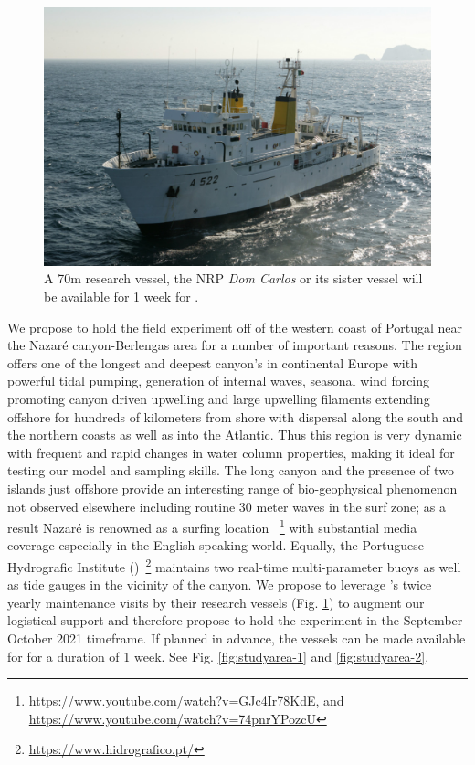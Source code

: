 \begin{figure}
  \vspace{-0.5cm}
  \centering
  \includegraphics[scale=2]{fig/dom-carlos.jpg}
  \caption{A 70m research vessel, the NRP \emph{Dom Carlos} or its
    sister vessel will be available for 1 week for \proje.}
  \vspace{-0.3cm}
 \label{fig:vessel}
\end{figure}


We propose to hold the field experiment off of the western coast of
Portugal near the Nazar\'e canyon-Berlengas area for a number of
important reasons. The region offers one of the longest and deepest
canyon's in continental Europe with powerful tidal pumping, generation
of internal waves, seasonal wind forcing promoting canyon driven
upwelling and large upwelling filaments extending offshore for
hundreds of kilometers from shore with dispersal along the south and
the northern coasts as well as into the Atlantic.  Thus this region is
very dynamic with frequent and rapid changes in water column
properties, making it ideal for testing our model and sampling skills.
The long canyon and the presence of two islands just offshore provide
an interesting range of bio-geophysical phenomenon not observed
elsewhere including routine 30 meter waves in the surf zone; as a
result Nazar\'e is renowned as a surfing location
~\footnote{\url{https://www.youtube.com/watch?v=GJc4Ir78KdE}, and
  \url{https://www.youtube.com/watch?v=74pnrYPozcU}} with substantial
media coverage especially in the English speaking world.  Equally, the
Portuguese Hydrografic Institute
(\inste)~\footnote{\url{https://www.hidrografico.pt/}} maintains two
real-time multi-parameter buoys as well as tide gauges in the vicinity
of the canyon. We propose to leverage \inste's twice yearly
maintenance visits by their research vessels (Fig. \ref{fig:vessel})
to augment our logistical support and therefore propose to hold the
experiment in the September-October 2021 timeframe. If planned in
advance, the vessels can be made available for \proj for a duration of
1 week. See Fig. \ref{fig:studyarea-1} and \ref{fig:studyarea-2}.

